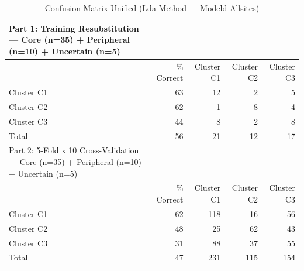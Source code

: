 \begin{table}[htbp]
  \centering
  \caption{Confusion Matrix Unified (Lda Method — Modeld Allsites)}
  \label{tab:LDA_Method_ModelD_AllSites_tables_confusion_matrix_unified}
  \begin{tabular}{lrrrr}
    \toprule
    Part 1: Training Resubstitution — Core (n=35) + Peripheral (n=10) + Uncertain (n=5) &  &  &  &  \\
    \midrule
     & \% Correct & Cluster C1 & Cluster C2 & Cluster C3 \\
    Cluster C1 & 63 & 12 & 2 & 5 \\
    Cluster C2 & 62 & 1 & 8 & 4 \\
    Cluster C3 & 44 & 8 & 2 & 8 \\
    Total & 56 & 21 & 12 & 17 \\
    Part 2: 5-Fold x 10 Cross-Validation — Core (n=35) + Peripheral (n=10) + Uncertain (n=5) &  &  &  &  \\
     & \% Correct & Cluster C1 & Cluster C2 & Cluster C3 \\
    Cluster C1 & 62 & 118 & 16 & 56 \\
    Cluster C2 & 48 & 25 & 62 & 43 \\
    Cluster C3 & 31 & 88 & 37 & 55 \\
    Total & 47 & 231 & 115 & 154 \\
    \bottomrule
  \end{tabular}
\end{table}
